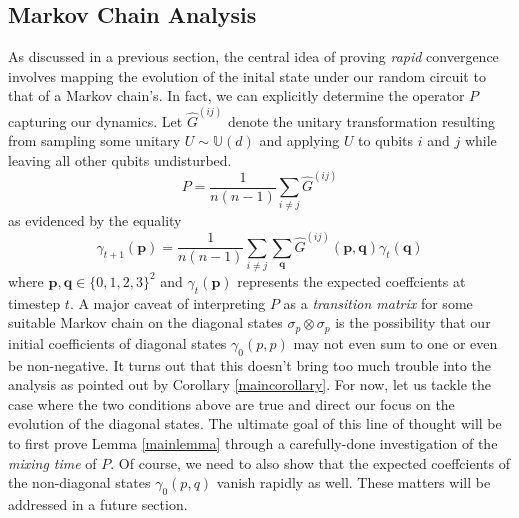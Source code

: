 \documentclass[12pt]{amsart}
\theoremstyle{definition}
\theoremstyle{remark}
\numberwithin{equation}{section}
\theoremstyle{remark}
\begin{document}
\subsection{Markov Chain Analysis}
As discussed in a previous section, the central idea of proving \emph{rapid} convergence involves mapping the evolution of the inital state under our random circuit to that of a Markov chain's. In fact, we can explicitly determine the operator $P$ capturing our dynamics. Let $\widehat{G}^{(ij)}$ denote the unitary transformation resulting from sampling some unitary $U \sim \mathbb{U}(d)$ and applying $U$ to qubits $i$ and $j$ while leaving all other qubits undisturbed.
%
\begin{equation} \label{schemechain}
P = \frac{1}{n(n-1)}\sum_{i \neq j} \widehat{G}^{(ij)}
\end{equation}
as evidenced by the equality
\begin{equation}
  \gamma_{t+1}(\textbf{p}) = \frac{1}{n(n-1)}\sum_{i \neq j}\sum_{\textbf{q}} \widehat{G}^{(ij)}(\textbf{p},\textbf{q})\gamma_t(\textbf{q})
\end{equation}
where $\textbf{p},\textbf{q} \in \{0,1,2,3\}^2$ and $\gamma_t(\textbf{p})$ represents the expected coeffcients at timestep $t$.
%
A major caveat of interpreting $P$ as a \emph{transition matrix} for some suitable Markov chain on the diagonal states $\sigma_p \otimes \sigma_p$ is the possibility that our initial coefficients of diagonal states $\gamma_0(p,p)$ may not even sum to one or even be non-negative. It turns out that this doesn't bring too much trouble into the analysis as pointed out by Corollary \ref{maincorollary}. For now, let us tackle the case where the two conditions above are true and direct our focus on the evolution of the diagonal states. The ultimate goal of this line of thought will be to first prove Lemma \ref{mainlemma} through a carefully-done investigation of the \emph{mixing time} of $P$. Of course, we need to also show that the expected coeffcients of the non-diagonal states $\gamma_0(p,q)$ vanish rapidly as well. These matters will be addressed in a future section.
\end{document}

